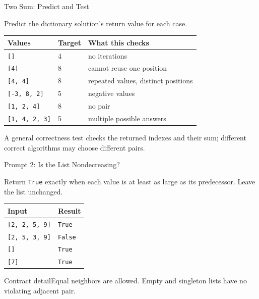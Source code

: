 \documentclass[aspectratio=169,10pt]{beamer}
\begin{document}
\begin{frame}{Two Sum: Predict and Test}
\small
\begin{activity}Predict the dictionary solution's return value for each case.\end{activity}
\begin{center}
\begin{tabular}{lll}
\textbf{Values} & \textbf{Target} & \textbf{What this checks}\\\hline
\texttt{[]} & 4 & no iterations\\
\texttt{[4]} & 8 & cannot reuse one position\\
\texttt{[4, 4]} & 8 & repeated values, distinct positions\\
\texttt{[-3, 8, 2]} & 5 & negative values\\
\texttt{[1, 2, 4]} & 8 & no pair\\
\texttt{[1, 4, 2, 3]} & 5 & multiple possible answers
\end{tabular}
\end{center}
\begin{keyidea}A general correctness test checks the returned indexes and their sum; different correct algorithms may choose different pairs.\end{keyidea}
\end{frame}


\begin{frame}{Prompt 2: Is the List Nondecreasing?}
\small
\begin{activity}
Return \texttt{True} exactly when each value is at least as large as its predecessor. Leave the list unchanged.
\end{activity}
\begin{center}
\begin{tabular}{ll}
\textbf{Input} & \textbf{Result}\\\hline
\texttt{[2, 2, 5, 9]} & \texttt{True}\\
\texttt{[2, 5, 3, 9]} & \texttt{False}\\
\texttt{[]} & \texttt{True}\\
\texttt{[7]} & \texttt{True}
\end{tabular}
\end{center}
\begin{block}{Contract detail}Equal neighbors are allowed. Empty and singleton lists have no violating adjacent pair.\end{block}
\end{frame}
\end{document}
